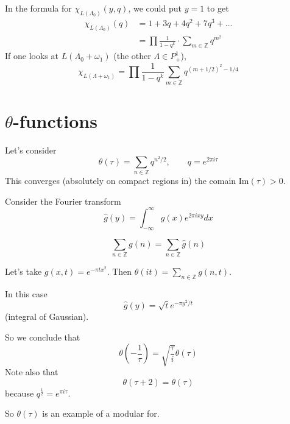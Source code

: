 \begin{remark}
\label{remark-}
In the formula for $\chi_{L(\Lambda_0)}(y,q)$, 
we could put $y=1$ to get
\begin{align*}
\chi_{L(\Lambda_0)}(q)&=1+3q+4q^2+7q^3+\ldots\\
&=\prod\frac{1}{1-q^k}\cdot \sum_{m \in \mathbb{Z}}q^{m^2}
\end{align*}
If one looks at $L(\Lambda_0+\omega_1)$ (the other $\Lambda \in P_+^1$),
$$
\chi_{L(\Lambda+\omega_1)}=\prod \frac{1}{1-q^k}
\sum_{m \in \mathbb{Z}}q^{(m+1/2)^2-1/4}
$$
\end{remark}

\section{$\theta$-functions}
\label{section-theta-functions}
Let's consider
$$
\theta(\tau)=\sum_{n \in \mathbb{Z}}q^{n^2/2},\qquad q=e^{2\pi i \tau}
$$
This converges (absolutely on compact regions in) 
the comain $\text{Im}(\tau)>0$.

Consider the Fourier transform
$$
\hat{g}(y)=\int_{-\infty}^\infty g(x)e^{2\pi ixy}dx
$$

\begin{theorem}
\label{theorem-Poisson-summation}
 $$
\sum_{n \in \mathbb{Z}}g(n)=\sum_{n \in \mathbb{Z}}\hat{g}(n)
$$
\end{theorem}

Let's take $g(x,t)=e^{-\pi tx^2}$.
Then $\theta(it)=\sum_{n\in \mathbb{Z}}g(n,t)$.

In this case
$$
\hat{g}(y)=\sqrt{t}e^{-\pi y^2/t}
$$
(integral of Gaussian).

So we conclude that
$$
\theta\left(-\frac{1}{\tau}\right)=\sqrt{\frac{\tau}{i}}\theta(\tau)
$$
Note also that
$$
\theta(\tau+2)=\theta(\tau)
$$
because $q^{\frac{1}{2}}=e^{\pi i\tau}$.

So $\theta(\tau)$ is an example of a modular for.

